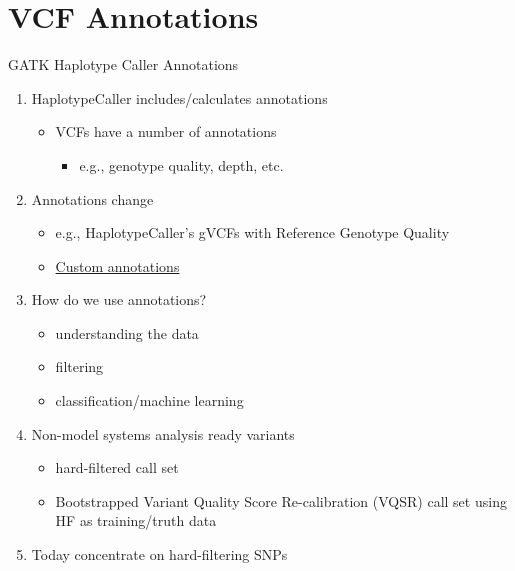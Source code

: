 \documentclass[t,10pt]{beamer}
\begin{document}
\section{VCF Annotations}
\label{sec:orgheadline17}
\begin{frame}[label={sec:orgheadline5}]{GATK Haplotype Caller Annotations}
\begin{enumerate}[<+->]
\item HaplotypeCaller includes/calculates annotations
\begin{itemize}
\item VCFs have a number of annotations
\begin{itemize}
\item e.g., genotype quality, depth, etc.
\end{itemize}
\end{itemize}
\item Annotations change
\begin{itemize}
\item e.g., HaplotypeCaller's gVCFs with Reference Genotype Quality
\item \href{https://software.broadinstitute.org/gatk/documentation/tooldocs/current/org_broadinstitute_gatk_tools_walkers_annotator_VariantAnnotator}{Custom annotations}
\end{itemize}
\item How do we use annotations?
\begin{itemize}
\item understanding the data
\item filtering
\item classification/machine learning
\end{itemize}
\item Non-model systems analysis ready variants
\begin{itemize}
\item hard-filtered call set
\item Bootstrapped Variant Quality Score Re-calibration (VQSR) call set using HF as training/truth data
\end{itemize}
\item Today concentrate on hard-filtering SNPs
\end{enumerate}
\end{frame}
\end{document}
